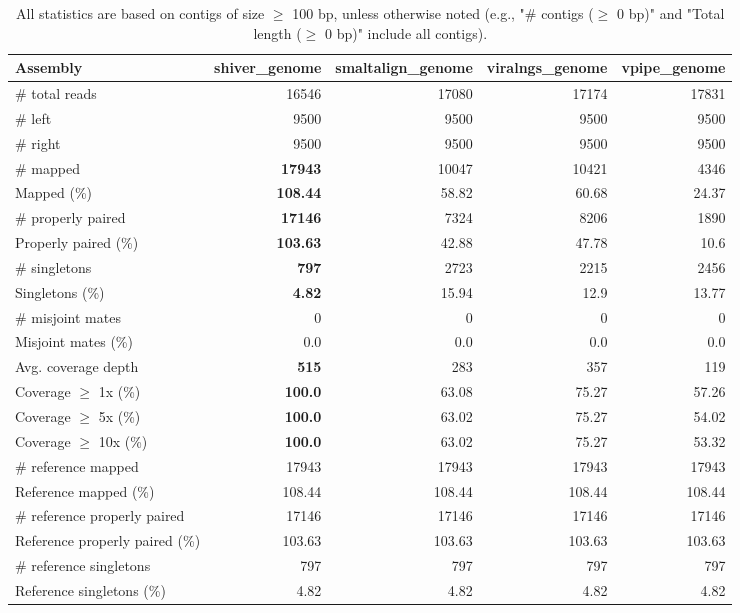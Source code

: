 \documentclass[12pt,a4paper]{article}
\begin{document}
\begin{table}[ht]
\begin{center}
\caption{All statistics are based on contigs of size $\geq$ 100 bp, unless otherwise noted (e.g., "\# contigs ($\geq$ 0 bp)" and "Total length ($\geq$ 0 bp)" include all contigs).}
\begin{tabular}{|l*{4}{|r}|}
\hline
Assembly & shiver\_genome & smaltalign\_genome & viralngs\_genome & vpipe\_genome \\ \hline
\# total reads & 16546 & 17080 & 17174 & 17831 \\ \hline
\# left & 9500 & 9500 & 9500 & 9500 \\ \hline
\# right & 9500 & 9500 & 9500 & 9500 \\ \hline
\# mapped & {\bf 17943} & 10047 & 10421 & 4346 \\ \hline
Mapped (\%) & {\bf 108.44} & 58.82 & 60.68 & 24.37 \\ \hline
\# properly paired & {\bf 17146} & 7324 & 8206 & 1890 \\ \hline
Properly paired (\%) & {\bf 103.63} & 42.88 & 47.78 & 10.6 \\ \hline
\# singletons & {\bf 797} & 2723 & 2215 & 2456 \\ \hline
Singletons (\%) & {\bf 4.82} & 15.94 & 12.9 & 13.77 \\ \hline
\# misjoint mates & 0 & 0 & 0 & 0 \\ \hline
Misjoint mates (\%) & 0.0 & 0.0 & 0.0 & 0.0 \\ \hline
Avg. coverage depth & {\bf 515} & 283 & 357 & 119 \\ \hline
Coverage $\geq$ 1x (\%) & {\bf 100.0} & 63.08 & 75.27 & 57.26 \\ \hline
Coverage $\geq$ 5x (\%) & {\bf 100.0} & 63.02 & 75.27 & 54.02 \\ \hline
Coverage $\geq$ 10x (\%) & {\bf 100.0} & 63.02 & 75.27 & 53.32 \\ \hline
\# reference mapped & 17943 & 17943 & 17943 & 17943 \\ \hline
Reference mapped (\%) & 108.44 & 108.44 & 108.44 & 108.44 \\ \hline
\# reference properly paired & 17146 & 17146 & 17146 & 17146 \\ \hline
Reference properly paired (\%) & 103.63 & 103.63 & 103.63 & 103.63 \\ \hline
\# reference singletons & 797 & 797 & 797 & 797 \\ \hline
Reference singletons (\%) & 4.82 & 4.82 & 4.82 & 4.82 \\ \hline

\end{tabular}
\end{center}
\end{table}
\end{document}
